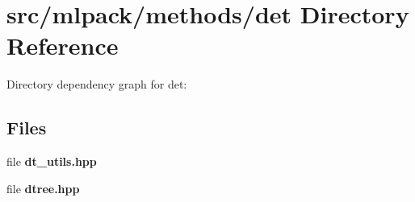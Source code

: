 \section{src/mlpack/methods/det Directory Reference}
\label{dir_ff7a480eae7f7a4184649661d49eaa57}
Directory dependency graph for det\-:
\subsection*{Files}
\begin{DoxyCompactItemize}
\item 
file {\bf dt\-\_\-utils.\-hpp}
\item 
file {\bf dtree.\-hpp}
\end{DoxyCompactItemize}
